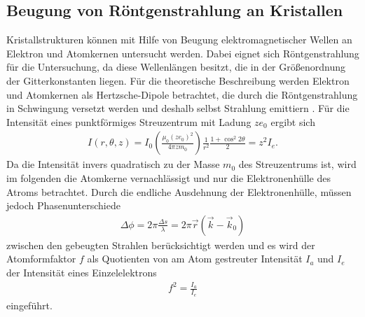 \FloatBarrier

\subsection{Beugung von Röntgenstrahlung an Kristallen}
\label{subsec:Beugung}
Kristallstrukturen können mit Hilfe von Beugung
elektromagnetischer Wellen an Elektron und Atomkernen untersucht werden.
Dabei eignet sich Röntgenstrahlung
für die Untersuchung, da diese
Wellenlängen besitzt, die in der
Größenordnung der Gitterkonstanten liegen.
Für die theoretische Beschreibung werden Elektron
und Atomkernen
als Hertzsche-Dipole betrachtet, die durch die
Röntgenstrahlung in Schwingung versetzt
werden und deshalb selbst
Strahlung emittiern .
Für die Intensität eines punktförmiges Streuzentrum mit
Ladung $ze_0$ ergibt sich
\begin{align}
I(r,\theta,z) = I_0\left(\frac{\mu_0 (ze_0)^2}{4\pi zm_0}\right)\frac{1}{r^2}\frac{1+\cos^2 2\theta}{2}=z^2 I_e \label{6}.
\end{align}
Da die Intensität invers
quadratisch zu der Masse $m_0$ des Streuzentrums ist,
wird im folgenden die Atomkerne vernachlässigt und
nur die Elektronenhülle des Atroms betrachtet.
Durch die endliche Ausdehnung der Elektronenhülle,
müssen jedoch Phasenunterschiede
\begin{align*}
\Delta\phi=2\pi\frac{\Delta s}{\lambda}= 2\pi\vec{r}\left(\vec{k}-\vec{k}_0\right)
\end{align*}
zwischen den gebeugten
Strahlen berücksichtigt werden und es wird
der Atomformfaktor $f$ als Quotienten
von am Atom gestreuter Intensität $I_a$ und $I_e$ der
Intensität eines Einzelelektrons
\begin{align}
f^2=\frac{I_a}{I_e}
\end{align}
eingeführt.

